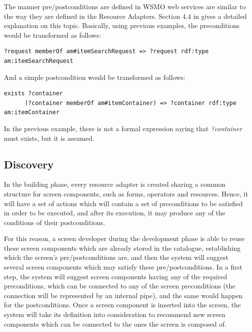 \documentclass{fast_latex}
\begin{document}
The manner pre/postconditions are defined in WSMO web services are similar to the way they are defined in the Resource Adapters. Section 4.4 in \cite{moller2010fast_ontology} gives a detailed explanation on this topic. Basically, using previous examples, the preconditions would be transformed as follows:

\begin{verbatim}
?request memberOf am#itemSearchRequest => ?request rdf:type am:itemSearchRequest
\end{verbatim}

And a simple postcondition would be transformed as follows:

\begin{verbatim}
exists ?container 
      (?container memberOf am#itemContainer) => ?container rdf:type am:itemContainer
\end{verbatim}

In the previous example, there is not a formal expression saying that \emph{?container} must exists, but it is assumed.


\subsection{Discovery} %
\label{sub:discovery}

In the building phase, every resource adapter is created sharing a common structure for screen components, such as forms, operators and resources. Hence, it will have a set of actions which will contain a set of preconditions to be satisfied in order to be executed, and after its execution, it may produce any of the conditions of their postconditions.

For this reason, a screen developer during the development phase is able to reuse these screen components which are already stored in the catalogue, establishing which the screen's pre/postconditions are, and then the system will suggest several screen components which may satisfy these pre/postconditions. In a first step, the system will suggest screen components having any of the required preconditions, which can be connected to any of the screen preconditions (the connection will be represented by an internal pipe), and the same would happen for the postconditions. Once a screen component is inserted into the screen, the system will take its definition into consideration to recommend new screen components which can be connected to the ones the screen is composed of.
\end{document}
